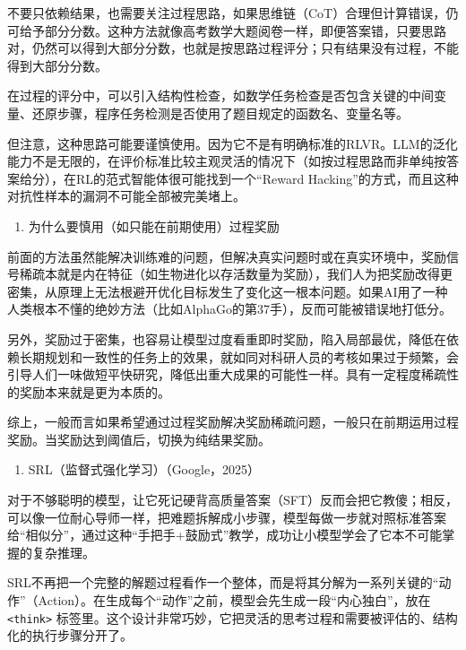 不要只依赖结果，也需要关注过程思路，如果思维链（CoT）合理但计算错误，仍可给予部分分数。这种方法就像高考数学大题阅卷一样，即便答案错，只要思路对，仍然可以得到大部分分数，也就是按思路过程评分；只有结果没有过程，不能得到大部分分数。

在过程的评分中，可以引入结构性检查，如数学任务检查是否包含关键的中间变量、还原步骤，程序任务检测是否使用了题目规定的函数名、变量名等。

但注意，这种思路可能要谨慎使用。因为它不是有明确标准的RLVR。LLM的泛化能力不是无限的，在评价标准比较主观灵活的情况下（如按过程思路而非单纯按答案给分），在RL的范式智能体很可能找到一个``Reward Hacking''的方式，而且这种对抗性样本的漏洞不可能全部被完美堵上。

\begin{enumerate}
\def\labelenumi{\arabic{enumi}.}
\setcounter{enumi}{1}
\tightlist
\item
  为什么要慎用（如只能在前期使用）过程奖励
\end{enumerate}

前面的方法虽然能解决训练难的问题，但解决真实问题时或在真实环境中，奖励信号稀疏本就是内在特征（如生物进化以存活数量为奖励），我们人为把奖励改得更密集，从原理上无法根避开优化目标发生了变化这一根本问题。如果AI用了一种人类根本不懂的绝妙方法（比如AlphaGo的第37手），反而可能被错误地打低分。

另外，奖励过于密集，也容易让模型过度看重即时奖励，陷入局部最优，降低在依赖长期规划和一致性的任务上的效果，就如同对科研人员的考核如果过于频繁，会引导人们一味做短平快研究，降低出重大成果的可能性一样。具有一定程度稀疏性的奖励本来就是更为本质的。

综上，一般而言如果希望通过过程奖励解决奖励稀疏问题，一般只在前期运用过程奖励。当奖励达到阈值后，切换为纯结果奖励。

\begin{enumerate}
\def\labelenumi{\arabic{enumi}.}
\setcounter{enumi}{1}
\tightlist
\item
  SRL（监督式强化学习）（Google，2025）
\end{enumerate}

对于不够聪明的模型，让它死记硬背高质量答案（SFT）反而会把它教傻；相反，可以像一位耐心导师一样，把难题拆解成小步骤，模型每做一步就对照标准答案给``相似分''，通过这种``手把手+鼓励式''教学，成功让小模型学会了它本不可能掌握的复杂推理。

SRL不再把一个完整的解题过程看作一个整体，而是将其分解为一系列关键的``动作''（Action）。在生成每个``动作''之前，模型会先生成一段``内心独白''，放在 \texttt{\textless{}think\textgreater{}} 标签里。这个设计非常巧妙，它把灵活的思考过程和需要被评估的、结构化的执行步骤分开了。

